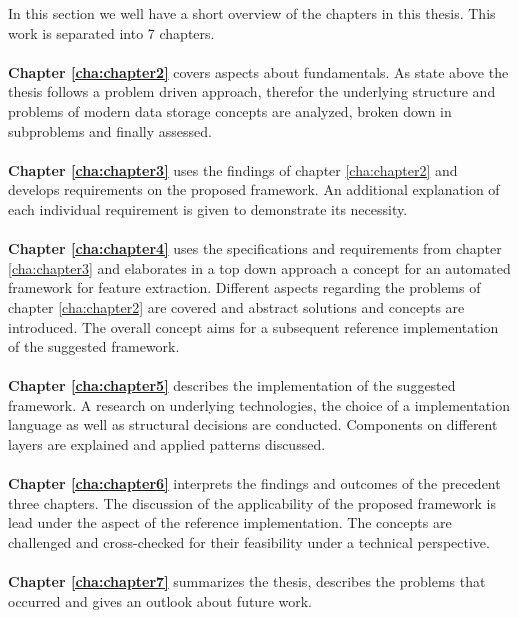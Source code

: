 In this section we well have a short overview of the chapters in this thesis. This work is separated into 7 chapters.
\\\\
\textbf{Chapter \ref{cha:chapter2}} covers aspects about fundamentals. As state above the thesis follows a problem driven approach, therefor the underlying structure and problems of modern data storage concepts are analyzed, broken down in subproblems and finally assessed.
\\\\
\textbf{Chapter \ref{cha:chapter3}} uses the findings of chapter \ref{cha:chapter2} and develops requirements on the proposed framework. An additional explanation of each individual requirement is given to demonstrate its necessity.
\\\\
\textbf{Chapter \ref{cha:chapter4}} uses the specifications and requirements from chapter \ref{cha:chapter3} and elaborates in a top down approach a concept for an automated framework for feature extraction. Different aspects regarding the problems of chapter \ref{cha:chapter2} are covered and abstract solutions and concepts are introduced. The overall concept aims for a subsequent reference implementation of the suggested framework.
\\\\
\textbf{Chapter \ref{cha:chapter5}} describes the implementation of the suggested framework. A research on underlying technologies, the choice of a implementation language as well as structural decisions are conducted. Components on different layers are explained and applied patterns discussed. 
\\\\
\textbf{Chapter \ref{cha:chapter6}} interprets the findings and outcomes of the precedent three chapters. The discussion of the applicability of the proposed framework is lead under the aspect of the reference implementation. The concepts are challenged and cross-checked for their feasibility under a technical perspective.
\\\\
\textbf{Chapter \ref{cha:chapter7}} summarizes the thesis, describes the problems that occurred and gives an outlook about future work.